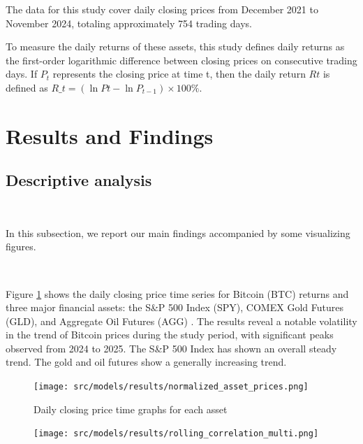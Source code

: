 \documentclass{article}
\begin{document}
The data for this study cover daily closing prices from December 2021 to November 2024, totaling approximately 754 trading days.



To measure the daily returns of these assets, this study defines daily returns as the first-order logarithmic difference between closing prices on consecutive trading days. If $P_t$  represents the closing price at time t, then the daily return $Rt$ is defined as $R\_t = (\ln Pt - \ln P_{t-1}) \times 100\%$. 

\section{Results and Findings}




\subsection{Descriptive analysis}
\

In this subsection, we report our main findings accompanied by some visualizing figures.

\

Figure \ref{prince} shows the daily closing price time series for Bitcoin (BTC) returns and three major financial assets: the S\&P 500 Index (SPY), COMEX Gold Futures (GLD), and Aggregate Oil Futures (AGG) . The results reveal a notable volatility in the trend of Bitcoin prices during the study period, with significant peaks observed from 2024 to 2025. The S\&P 500 Index has shown an overall steady trend. The gold and oil futures show a generally increasing trend.
\

\begin{figure}[h!]
    \centering
    \texttt{[image: src/models/results/normalized\_asset\_prices.png]}
    \caption{Daily closing price time graphs for each asset}
    \label{prince}
    
\end{figure}



\begin{figure}[h!]
    \centering
    \texttt{[image: src/models/results/rolling\_correlation\_multi.png]}
    \caption{}
    \label{volatility}
    
\end{figure}
\end{document}
